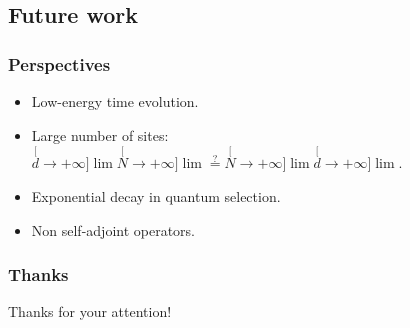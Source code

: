 \documentclass[mathserif]{beamer}
\begin{document}
\subsection{Future work}
\begin{frame}
  \frametitle{Perspectives}
    \begin{itemize}
    \item Low-energy time evolution.
    \item Large number of sites: $\stackrel[d\to +\infty]{}{\lim}\stackrel[N\to +\infty]{}{\lim}\stackrel{?}{=}\stackrel[N\to +\infty]{}{\lim}\stackrel[d\to +\infty]{}{\lim}$.
    \item Exponential decay in quantum selection.
    \item Non self-adjoint operators.
    \end{itemize}
  \end{frame}

  \begin{frame}
    \frametitle{Thanks}
    \centering 
    {\Large Thanks for your attention!}
  \end{frame}
  
\end{document}
